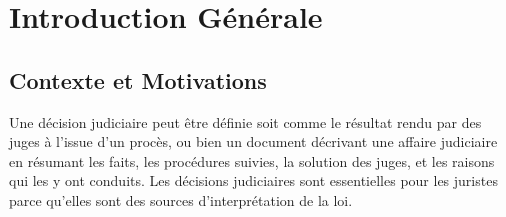 %
\chapter*{Introduction Générale}
\label{sec:intro}

\section{Contexte et Motivations}
\label{sec:intro:contexte}
Une décision judiciaire peut être définie soit comme  le résultat rendu par des juges à l'issue d'un procès, ou bien un document décrivant une affaire judiciaire en résumant les faits, les procédures suivies, la solution des juges, et les raisons qui les y ont conduits. %
Les décisions judiciaires sont essentielles pour les juristes parce qu'elles sont des sources d'interprétation de la loi.

